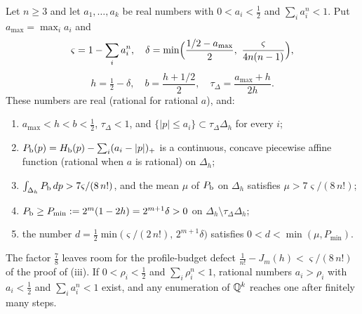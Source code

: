 \begin{lemma}\label{lem:qdr-auxiliary}
Let $n\ge3$ and let $a_1,\dots,a_k$ be real numbers with $0<a_i<\frac12$ and $\sum_ia_i^n<1$. Put $a_{\max}=\max_ia_i$ and
\[
 \varsigma=1-\sum_ia_i^n,\quad
 \delta=\min\Bigl(\frac{1/2-a_{\max}}2,\ \frac{\varsigma}{4n(n-1)}\Bigr),
\]
\[
 h=\tfrac12-\delta,\quad b=\frac{h+1/2}2,\quad \tau_\Delta=\frac{a_{\max}+h}{2h}.
\]
These numbers are real (rational for rational $a$), and:
\begin{enumerate}[label=(\roman*)]
\item $a_{\max}<h<b<\frac12$, $\tau_\Delta<1$, and $\{|p|\le a_i\}\subset\tau_\Delta\Delta_h$ for every $i$;
\item $P_{\mathrm b}(p)=H_{\mathrm b}(p)-\sum_i(a_i-|p|)_+$ is a continuous, concave piecewise affine function (rational when $a$ is rational) on $\Delta_h$;
\item $\int_{\Delta_h}P_{\mathrm b}\,dp>7\varsigma/(8\,n!)$, and the mean $\mu$ of $P_{\mathrm b}$ on $\Delta_h$ satisfies $\mu>7\varsigma/(8\,n!)$;
\item $P_{\mathrm b}\ge P_{\min}:=2^m(1-2h)=2^{m+1}\delta>0$ on $\Delta_h\setminus\tau_\Delta\Delta_h$;
\item the number $d=\frac12\min\bigl(\varsigma/(2\,n!),\,2^{m+1}\delta\bigr)$ satisfies $0<d<\min(\mu,P_{\min})$.
\end{enumerate}
The factor $\frac78$ leaves room for the profile-budget defect $\frac1{n!}-J_m(h)<\varsigma/(8\,n!)$ of the proof of (iii). If
$0<\rho_i<\frac12$ and $\sum_i\rho_i^n<1$, rational numbers $a_i>\rho_i$ with $a_i<\frac12$ and $\sum_ia_i^n<1$ exist, and any
enumeration of $\mathbb{Q}^k$ reaches one after finitely many steps.
\end{lemma}

